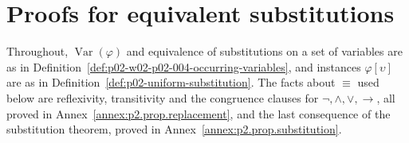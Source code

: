 \section{Proofs for equivalent substitutions}
\label{sec:annex-p02-w02-p02-004-equivalent-substitutions}

Throughout, \(\operatorname{Var}(\varphi)\) and equivalence of substitutions on
a set of variables are as in
Definition~\ref{def:p02-w02-p02-004-occurring-variables}, and instances
\(\varphi[\upsilon]\) are as in
Definition~\ref{def:p02-uniform-substitution}.  The facts about \(\equiv\)
used below are reflexivity, transitivity and the congruence clauses for
\(\neg,\land,\lor,\to\), all proved in
Annex~\ref{annex:p2.prop.replacement}, and the last consequence of the
substitution theorem, proved in Annex~\ref{annex:p2.prop.substitution}.

